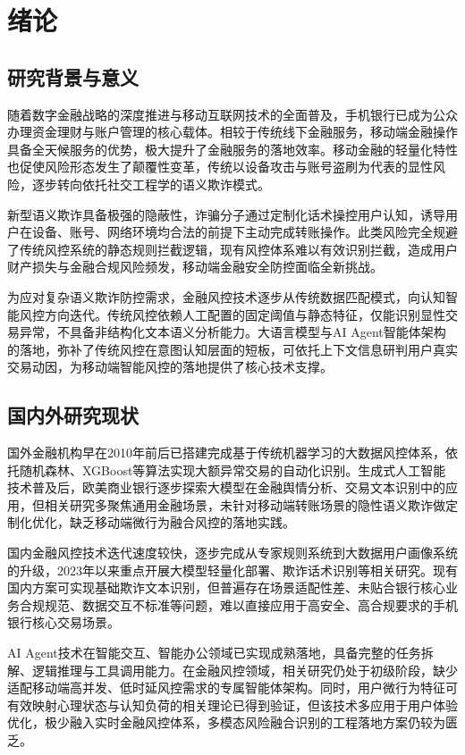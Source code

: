 \documentclass{xduugthesis}
\begin{document}
\chapter{绪论}

\section{研究背景与意义}

随着数字金融战略的深度推进与移动互联网技术的全面普及，手机银行已成为公众办理资金理财与账户管理的核心载体。相较于传统线下金融服务，移动端金融操作具备全天候服务的优势，极大提升了金融服务的落地效率。移动金融的轻量化特性也促使风险形态发生了颠覆性变革，传统以设备攻击与账号盗刷为代表的显性风险，逐步转向依托社交工程学的语义欺诈模式\cite{ahi2025risks}。

新型语义欺诈具备极强的隐蔽性，诈骗分子通过定制化话术操控用户认知，诱导用户在设备、账号、网络环境均合法的前提下主动完成转账操作。此类风险完全规避了传统风控系统的静态规则拦截逻辑，现有风控体系难以有效识别拦截，造成用户财产损失与金融合规风险频发，移动端金融安全防控面临全新挑战。

为应对复杂语义欺诈防控需求，金融风控技术逐步从传统数据匹配模式，向认知智能风控方向迭代。传统风控依赖人工配置的固定阈值与静态特征，仅能识别显性交易异常，不具备非结构化文本语义分析能力。大语言模型与AI Agent智能体架构的落地，弥补了传统风控在意图认知层面的短板，可依托上下文信息研判用户真实交易动因，为移动端智能风控的落地提供了核心技术支撑。

\section{国内外研究现状}

国外金融机构早在2010年前后已搭建完成基于传统机器学习的大数据风控体系，依托随机森林、XGBoost等算法实现大额异常交易的自动化识别\cite{dubey2025transformer}。生成式人工智能技术普及后，欧美商业银行逐步探索大模型在金融舆情分析、交易文本识别中的应用，但相关研究多聚焦通用金融场景，未针对移动端转账场景的隐性语义欺诈做定制化优化，缺乏移动端微行为融合风控的落地实践。

国内金融风控技术迭代速度较快，逐步完成从专家规则系统到大数据用户画像系统的升级，2023年以来重点开展大模型轻量化部署、欺诈话术识别等相关研究\cite{nie2025multimodal}。现有国内方案可实现基础欺诈文本识别，但普遍存在场景适配性差、未贴合银行核心业务合规规范、数据交互不标准等问题，难以直接应用于高安全、高合规要求的手机银行核心交易场景。

AI Agent技术在智能交互、智能办公领域已实现成熟落地，具备完整的任务拆解、逻辑推理与工具调用能力。在金融风控领域，相关研究仍处于初级阶段，缺少适配移动端高并发、低时延风控需求的专属智能体架构。同时，用户微行为特征可有效映射心理状态与认知负荷的相关理论已得到验证，但该技术多应用于用户体验优化，极少融入实时金融风控体系，多模态风险融合识别的工程落地方案仍较为匮乏。
\end{document}

